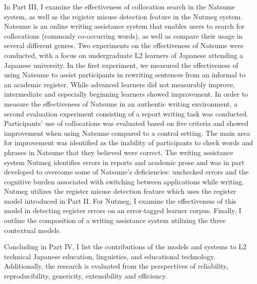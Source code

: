 In Part III, I examine the effectiveness of collocation search in the Natsume system, as well as the register misuse detection feature in the Nutmeg system.
Natsume is an online writing assistance system that enables users to search for collocations (commonly co-occurring words), as well as compare their usage in several different genres.
Two experiments on the effectiveness of Natsume were conducted, with a focus on undergraduate L2 learners of Japanese attending a Japanese university.
In the first experiment, we measured the effectiveness of using Natsume to assist participants in rewriting sentences from an informal to an academic register.
While advanced learners did not measurably improve, intermediate and especially beginning learners showed improvement.
In order to measure the effectiveness of Natsume in an authentic writing environment, a second evaluation experiment consisting of a report writing task was conducted.
Participants' use of collocations was evaluated based on five criteria and showed improvement when using Natsume compared to a control setting.
The main area for improvement was identified as the inability of participants to check words and phrases in Natsume that they believed were correct.
The writing assistance system Nutmeg identifies errors in reports and academic prose and was in part developed to overcome some of Natsume's deficiencies: unchecked errors and the cognitive burden associated with switching between applications while writing.
Nutmeg utilizes the register misuse detection feature which uses the register model introduced in Part II.
For Nutmeg, I examine the effectiveness of this model in detecting register errors on an error-tagged learner corpus.
Finally, I outline the composition of a writing assistance system utilizing the three contextual models.

Concluding in Part IV, I list the contributions of the models and systems to L2 technical Japanese education, linguistics, and educational technology.
Additionally, the research is evaluated from the perspectives of reliability, reproducibility, genericity, extensibility and efficiency.

\endgroup

\vfill
